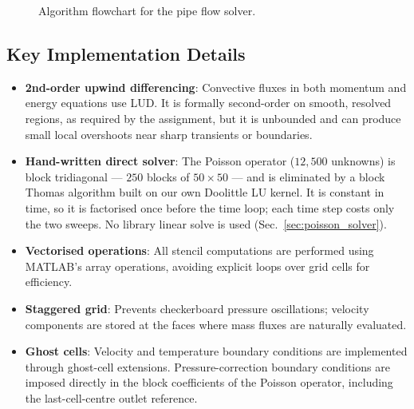 \documentclass[12pt,a4paper]{article}
\begin{document}
\begin{figure}[H]
\caption{Algorithm flowchart for the pipe flow solver.}
\label{fig:flowchart}
\end{figure}

\subsection{Key Implementation Details}

\begin{itemize}
    \item \textbf{2nd-order upwind differencing}: Convective fluxes in both momentum and energy equations use LUD. It is formally second-order on smooth, resolved regions, as required by the assignment, but it is unbounded and can produce small local overshoots near sharp transients or boundaries.

    \item \textbf{Hand-written direct solver}: The Poisson operator ($12{,}500$ unknowns) is block tridiagonal --- $250$ blocks of $50 \times 50$ --- and is eliminated by a block Thomas algorithm built on our own Doolittle LU kernel. It is constant in time, so it is factorised once before the time loop; each time step costs only the two sweeps. No library linear solve is used (Sec.~\ref{sec:poisson_solver}).

    \item \textbf{Vectorised operations}: All stencil computations are performed using MATLAB's array operations, avoiding explicit loops over grid cells for efficiency.

    \item \textbf{Staggered grid}: Prevents checkerboard pressure oscillations; velocity components are stored at the faces where mass fluxes are naturally evaluated.

    \item \textbf{Ghost cells}: Velocity and temperature boundary conditions are implemented through ghost-cell extensions. Pressure-correction boundary conditions are imposed directly in the block coefficients of the Poisson operator, including the last-cell-centre outlet reference.
\end{itemize}
\end{document}
